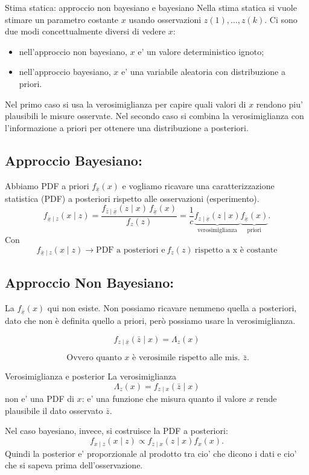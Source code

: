 \documentclass[11pt,a4paper]{article}
\begin{document}
\begin{spiegazione}{Stima statica: approccio non bayesiano e bayesiano}
Nella stima statica si vuole stimare un parametro costante $x$ usando osservazioni $z(1),\dots,z(k)$. Ci sono due modi concettualmente diversi di vedere $x$:
\begin{itemize}
  \item nell'approccio non bayesiano, $x$ e' un valore deterministico ignoto;
  \item nell'approccio bayesiano, $x$ e' una variabile aleatoria con distribuzione a priori.
\end{itemize}
Nel primo caso si usa la verosimiglianza per capire quali valori di $x$ rendono piu' plausibili le misure osservate. Nel secondo caso si combina la verosimiglianza con l'informazione a priori per ottenere una distribuzione a posteriori.
\end{spiegazione}

\subsection{Approccio Bayesiano:}
Abbiamo PDF a priori $f_{\overline{\underline{x}}}(x)$ e vogliamo ricavare una caratterizzazione statistica (PDF) a posteriori rispetto alle osservazioni (esperimento).
\[
f_{\overline{\underline{x}}\mid z}(x\mid z)=\frac{f_{\bar z\mid\overline{\underline{x}}}(z\mid x)\,f_{\overline{\underline{x}}}(x)}{f_{z}(z)}=\frac{1}{c}\underbrace{f_{z\mid\overline{\underline{x}}}(z\mid x)}_{\text{verosimiglianza}}\underbrace{f_{\overline{\underline{x}}}(x)}_{\text{priori}}.
\]
Con 
\[
f_{\overline{\underline{x}}\mid z}(x\mid z) \rightarrow \text{PDF a posteriori e} \ f_z(z) \ \text{rispetto a x è costante} 
\]
\subsection{Approccio Non Bayesiano:}

La $f_{\overline{\underline{x}}}(x)$ qui non esiste. Non possiamo ricavare nemmeno quella a posteriori, dato che non è definita quello a priori, però possiamo usare la verosimiglianza.

\[
f_{z\mid \overline{\underline{x}}}(\bar z\mid x)=\Lambda_z(x)
\]

\[
\
{\text{Ovvero quanto }x\text{ è verosimile rispetto alle mis. }\bar z.}
\]

\begin{spiegazione}{Verosimiglianza e posterior}
La verosimiglianza
\[
\Lambda_z(x)=f_{z\mid x}(\bar z\mid x)
\]
non e' una PDF di $x$: e' una funzione che misura quanto il valore $x$ rende plausibile il dato osservato $\bar z$.

Nel caso bayesiano, invece, si costruisce la PDF a posteriori:
\[
f_{x\mid z}(x\mid z)\propto f_{z\mid x}(z\mid x)f_x(x).
\]
Quindi la posterior e' proporzionale al prodotto tra cio' che dicono i dati e cio' che si sapeva prima dell'osservazione.
\end{spiegazione}
\end{document}

